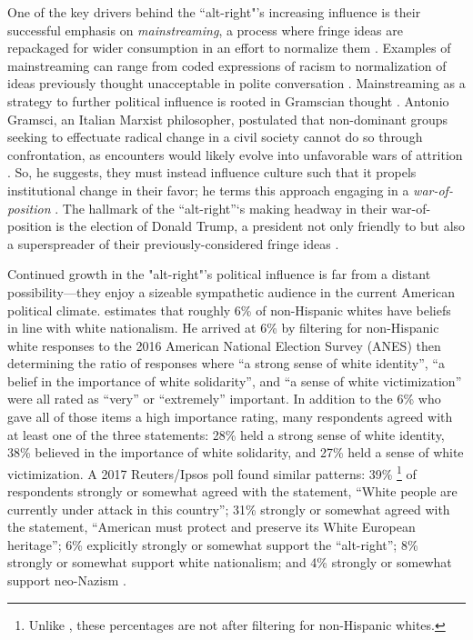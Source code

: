 \documentclass[acmlarge, screen, authorversion]{acmart}
\begin{document}
One of the key drivers behind the “alt-right"’s increasing influence is their
successful emphasis on \textit{mainstreaming}, a process where fringe ideas are
repackaged for wider consumption in an effort to normalize them
\cite{sternProudBoysWhite2019, mainRiseAltRight2018,
cammaertsMainstreamingExtremeRightWing2018}. Examples of mainstreaming can
range from coded
expressions of racism to normalization of ideas previously thought
unacceptable in polite conversation
\cite{cammaertsMainstreamingExtremeRightWing2018}. Mainstreaming as a
strategy to further political influence is rooted in Gramscian thought
\cite{nagleKillAllNormies2017, sternProudBoysWhite2019}. Antonio Gramsci, an
Italian Marxist philosopher, postulated that
non-dominant groups seeking to effectuate radical change in a civil
society cannot do so through confrontation, as encounters would likely evolve
into unfavorable wars of attrition \cite{delzellAntonioGramsciOrigins1967}. So,
he suggests, they must instead influence culture such that it propels
institutional change in their favor; he terms this approach engaging in a
\textit{war-of-position} \cite{buttigiegGramsciCivilSociety1995}. The hallmark
of the ``alt-right''`s making headway in their war-of-position is the election
of Donald Trump, a president
not only friendly to but also a superspreader of their previously-considered
fringe ideas \cite{brydenUnderlyingSociopoliticalProcesses2019}.

Continued growth in the "alt-right"'s political influence is far from a distant
possibility---they enjoy a sizeable sympathetic audience in the current
American political climate. \citet{hawleyDemographyAltRight2018} estimates that
roughly 6\% of non-Hispanic whites have beliefs in line with white nationalism.
He arrived at 6\% by filtering for non-Hispanic white responses to the 2016
American National Election Survey (ANES) then determining the ratio of
responses where “a strong sense of white identity”, “a belief in the importance
of white solidarity”, and “a sense of white victimization” were all rated as
“very” or “extremely” important. In addition to the 6\% who gave all of those items a
high importance rating, many respondents agreed with at least one of the three
statements: 28\% held a strong sense of white identity, 38\% believed in the
importance of white solidarity, and 27\% held a sense of white victimization. A
2017 Reuters/Ipsos poll found similar patterns: 39\% \footnote{Unlike
\citet{hawleyDemographyAltRight2018}, these percentages are not after filtering
for non-Hispanic whites.} of respondents strongly or somewhat agreed with the
statement, “White people are currently under attack in this country”; 31\%
strongly or somewhat agreed with the statement, “American must protect and
preserve its White European heritage”; 6\% explicitly strongly or somewhat
support the “alt-right”; 8\% strongly or somewhat support white nationalism;
and 4\% strongly or somewhat support neo-Nazism \cite{politicsNewPollAmericans}.
\end{document}
